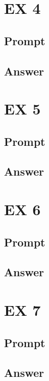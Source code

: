 \documentclass[10pt,a4paper]{article}
\theoremstyle{definition}
\begin{document}
\section{EX 4}
\subsection{Prompt}
\subsection{Answer}

\section{EX 5}
\subsection{Prompt}
\subsection{Answer}

\section{EX 6}
\subsection{Prompt}
\subsection{Answer}

\section{EX 7}
\subsection{Prompt}
\subsection{Answer}
\end{document}
